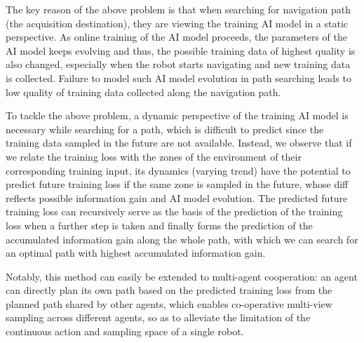 The key reason of the above problem is that when searching for navigation path (the acquisition destination), they are viewing the training AI model in a static perspective.
As online training of the AI model proceeds, the parameters of the AI model keeps evolving and thus, the possible training data of highest quality is also changed, especially when the robot starts navigating and new training data is collected.
Failure to model such AI model evolution in path searching leads to low quality of training data collected along the navigation path.



To tackle the above problem, a dynamic perspective of the training AI model is necessary while searching for a path, which is difficult to predict since the training data sampled in the future are not available.
Instead, we observe that if we relate the training loss with the zones of the environment of their corresponding training input, its dynamics (varying trend) have the potential to predict future training loss if the same zone is sampled in the future, whose diff reflects possible information gain and AI model evolution.
The predicted future training loss can recursively serve as the basis of the prediction of the training loss when a further step is taken and finally forms the prediction of the accumulated information gain along the whole path, with which we can search for an optimal path with highest accumulated information gain.

Notably, this method can easily be extended to multi-agent cooperation: an agent can directly plan its own path based on the predicted training loss from the planned path shared by other agents, which enables co-operative multi-view sampling across different agents, so as to alleviate the limitation of the continuous action and sampling space of a single robot.

